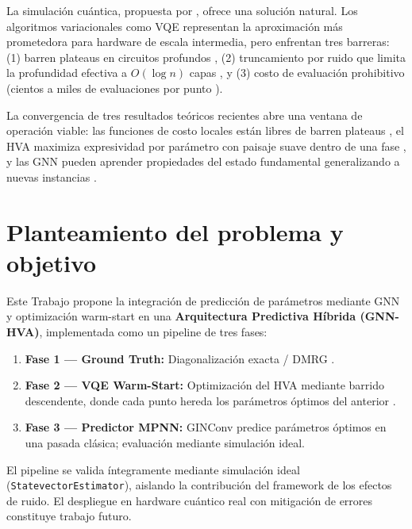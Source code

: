\documentclass[11pt,a4paper,spanish]{book}
\begin{document}
La simulación cuántica, propuesta por \citet{feynman1982}, ofrece una solución natural. Los algoritmos variacionales como VQE \citep{peruzzo2014} representan la aproximación más prometedora para hardware de escala intermedia, pero enfrentan tres barreras: (1) barren plateaus en circuitos profundos \citep{mcclean2018, cerezo2021}, (2) truncamiento por ruido que limita la profundidad efectiva a $O(\log n)$ capas \citep{mele2026}, y (3) costo de evaluación prohibitivo (cientos a miles de evaluaciones por punto \citep{tilly2022}).

La convergencia de tres resultados teóricos recientes abre una ventana de operación viable: las funciones de costo locales están libres de barren plateaus \citep{cerezo2021}, el HVA maximiza expresividad por parámetro con paisaje suave dentro de una fase \citep{wiersema2020, mele2022, puig2025}, y las GNN pueden aprender propiedades del estado fundamental generalizando a nuevas instancias \citep{huang2022, miao2024, zhang2025}.

\section{Planteamiento del problema y objetivo}

Este Trabajo propone la integración de predicción de parámetros mediante GNN \citep{miao2024, zhang2025} y optimización warm-start \citep{puig2025} en una \textbf{Arquitectura Predictiva Híbrida (GNN-HVA)}, implementada como un pipeline de tres fases:

\begin{enumerate}
    \item \textbf{Fase 1 --- Ground Truth:} Diagonalización exacta / DMRG \citep{schollwock2011}.
    \item \textbf{Fase 2 --- VQE Warm-Start:} Optimización del HVA mediante barrido descendente, donde cada punto hereda los parámetros óptimos del anterior \citep{puig2025, mele2022}.
    \item \textbf{Fase 3 --- Predictor MPNN:} GINConv \citep{xu2019} predice parámetros óptimos en una pasada clásica; evaluación mediante simulación ideal.
\end{enumerate}

El pipeline se valida íntegramente mediante simulación ideal (\texttt{StatevectorEstimator}), aislando la contribución del framework de los efectos de ruido. El despliegue en hardware cuántico real con mitigación de errores \citep{kim2023} constituye trabajo futuro.
\end{document}
